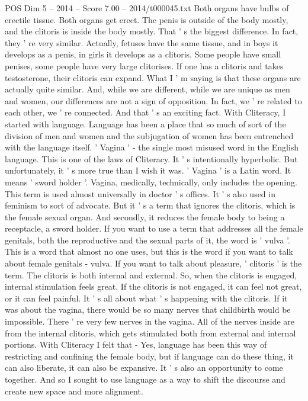 \begin{textsample}{POS Dim 5 – 2014 – Score 7.00 – 2014/t000045.txt}
Both organs have bulbs of erectile tissue.
Both organs get erect.
The penis is outside of the body mostly, and the clitoris is inside the body mostly.
That ' s the biggest difference.
In fact, they ' re very similar.
Actually, fetuses have the same tissue, and in boys it develops as a penis, in girls it develops as a clitoris.
Some people have small penises, some people have very large clitorises.
If one has a clitoris and takes testosterone, their clitoris can expand.
What I ' m saying is that these organs are actually quite similar.
And, while we are different, while we are unique as men and women, our differences are not a sign of opposition.
In fact, we ' re related to each other, we ' re connected.
And that ' s an exciting fact.
With Cliteracy, I started with language.
Language has been a place that so much of sort of the division of men and women and the subjugation of women has been entrenched with the language itself. ' Vagina ' - the single most misused word in the English language.
This is one of the laws of Cliteracy.
It ' s intentionally hyperbolic.
But unfortunately, it ' s more true than I wish it was. ' Vagina ' is a Latin word.
It means ' sword holder '.
Vagina, medically, technically, only includes the opening.
This term is used almost universally in doctor ' s offices.
It ' s also used in feminism to sort of advocate.
But it ' s a term that ignores the clitoris, which is the female sexual organ.
And secondly, it reduces the female body to being a receptacle, a sword holder.
If you want to use a term that addresses all the female genitals, both the reproductive and the sexual parts of it, the word is ' vulva '.
This is a word that almost no one uses, but this is the word if you want to talk about female genitals - vulva.
If you want to talk about pleasure, ' clitoris ' is the term.
The clitoris is both internal and external.
So, when the clitoris is engaged, internal stimulation feels great.
If the clitoris is not engaged, it can feel not great, or it can feel painful.
It ' s all about what ' s happening with the clitoris.
If it was about the vagina, there would be so many nerves that childbirth would be impossible.
There ' re very few nerves in the vagina.
All of the nerves inside are from the internal clitoris, which gets stimulated both from external and internal portions.
With Cliteracy I felt that - Yes, language has been this way of restricting and confining the female body, but if language can do these thing, it can also liberate, it can also be expansive.
It ' s also an opportunity to come together.
And so I sought to use language as a way to shift the discourse and create new space and more alignment.

\end{textsample}

